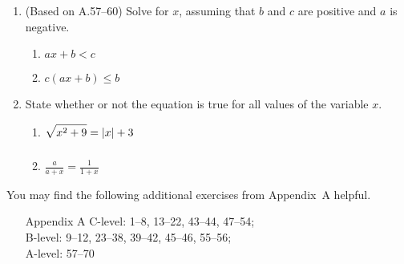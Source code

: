 \documentclass[11pt]{article}
\newcommand{\ds}{\displaystyle}
\begin{document}
\begin{enumerate}
  \begin{multicols}{2}
  \begin{enumerate}
  \item $\ds 3\le |2x| \le 5$
  \item $\ds 0<|x-4|<1$
  \end{enumerate}
  \end{multicols}
\item (Based on A.57--60) Solve for $x$, assuming that $b$ and $c$ are
  positive and $a$ is negative.
  \begin{multicols}{2}
  \begin{enumerate}
  \item $ax+b<c$
  \item $c(ax+b)\le b$
  \end{enumerate}
  \end{multicols}
\item State whether or not the equation is true for all values of the
  variable $x$. %
  \begin{multicols}{2}
  \begin{enumerate}
  \item $\ds\vphantom{\frac{x}{x+y}}\sqrt{x^2+9}=|x|+3$
  \item $\ds \frac{a}{a+x} = \frac{1}{1+x}$
  \end{enumerate}
  \end{multicols}
\end{enumerate}

\noindent
You may find the following additional exercises from Appendix~A
helpful.
\begin{itemize}
\item[Appendix A] 
  C-level: 1--8, 13--22, 43--44, 47--54; \\
  B-level: 9--12, 23--38, 39--42, 45--46, 55--56; \\
  A-level: 57--70
\end{itemize}
\end{document}
